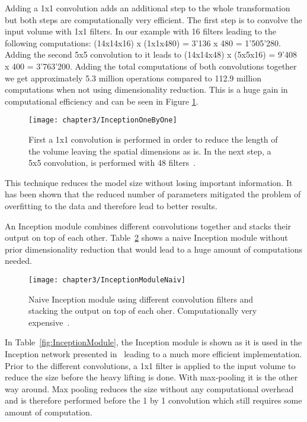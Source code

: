 \quad

Adding a 1x1 convolution adds an additional step to the whole transformation but both steps are computationally very efficient. The first step is to convolve the input volume with 1x1 filters. In our example with 16 filters leading to the following computations: (14x14x16) x (1x1x480) = 3'136 x 480 = 1'505'280. Adding the second 5x5 convolution to it leads to (14x14x48) x (5x5x16) = 9'408 x 400 = 3'763'200. Adding the total computations of both convolutions together we get approximately 5.3 million operations compared to 112.9 million computations when not using dimensionality reduction. This is a huge gain in computational efficiency and can be seen in Figure \ref{fig:inceptionOneByOne}.\\


\begin{figure}[!h]
  \centering
  \caption{First a 1x1 convolution is performed in order to reduce the length of the volume leaving the spatial dimensions as is. In the next step, a 5x5 convolution, is performed with 48 filters~\cite{ReviewGoogleLeNetv1}.}
  \texttt{[image: chapter3/InceptionOneByOne]}
  \label{fig:inceptionOneByOne}
\end{figure}

\quad

This technique reduces the model size without losing important information. It has been shown that the reduced number of parameters mitigated the problem of overfitting to the data and therefore lead to better results. 

An Inception module combines different convolutions together and stacks their output on top of each other. Table~\ref{fig:InceptionModuleNaiv} shows a naive Inception module without prior dimensionality reduction that would lead to a huge amount of computations needed. \\


\begin{figure}[!h]
  \centering
  \caption{Naive Inception module using different convolution filters and stacking the output on top of each oher. Computationally very expensive~\cite{ReviewGoogleLeNetv1}.}
  \texttt{[image: chapter3/InceptionModuleNaiv]}
  \label{fig:InceptionModuleNaiv}
\end{figure}

\quad

In Table~\ref{fig:InceptionModule}, the Inception module is shown as it is used in the Inception network presented in~\cite{szegedy2015going} leading to a much more efficient implementation. Prior to the different convolutions, a 1x1 filter is applied to the input volume to reduce the size before the heavy lifting is done. With max-pooling it is the other way around. Max pooling reduces the size without any computational overhead and is therefore performed before the 1 by 1 convolution which still requires some amount of computation.\\



